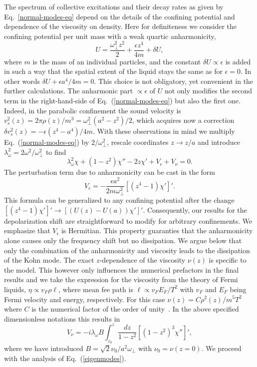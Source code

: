 The spectrum of collective excitations and their decay rates as given by Eq.~\eqref{normal-modes-eq} depend on the details of the confining potential and dependence of the viscosity on density. 
Here for definiteness we consider the confining potential per unit mass with a weak quartic anharmonicity,
\begin{equation}\label{U}
U=\frac{\omega^2_\perp z^2}{2}+\frac{\epsilon z^4}{4m}+\delta U,
\end{equation}
where $m$ is the mass of an individual particles, and the constant $\delta U\propto\epsilon$ is added in such a way that the spatial extent of the liquid stays the same as for $\epsilon=0$. In other words $\delta U+\epsilon a^4/4m=0$. This choice is not obligatory, yet convenient in the further calculations. 
The anharmonic part $\propto\epsilon$ of $U$ not only modifies the second term in the right-hand-side of Eq.~(\ref{normal-modes-eq}) but also the first one. Indeed, in the parabolic confinement the sound velocity is $v^2_s(z)=2\pi \rho(z)/m^3=\omega^2_\perp(a^2-z^2)/2$, which acquires now a correction $\delta v^2_s(z)=-\epsilon(z^4-a^4)/4m$.  
With these observations in mind we multiply Eq.~(\ref{normal-modes-eq}) by $2/\omega^2_\perp$, rescale coordinates $z\to z/a$ and introduce $\lambda^2_\omega=2\omega^2/\omega^2_\perp$ to find 
\begin{equation}\label{eigenmodes}
\lambda^2_\omega\chi+(1-z^2)\chi''-2z\chi'+V_\epsilon+V_\nu=0.
\end{equation}
The perturbation term due to anharmonicity can be cast in the form 
\begin{equation}\label{V1}
V_\epsilon=-\frac{\epsilon a^2}{2m\omega^2_\perp}[ (z^4-1)\chi ']'.
\end{equation}
This formula can be generalized to any confining potential after the change $[(z^4-1)\chi']'\to [(U(z)-U(a))\chi']'$. Consequently, our results for the depolarization shift are straightforward to modify for arbitrary confinements. 
We emphasize that $V_\epsilon$ is Hermitian. 
This property guaranties that the anharmonicity alone causes only the frequency shift but no dissipation. We argue below that only the combination of the anharmonicity and viscosity leads to the dissipation of the Kohn mode. The exact $z$-dependence of the viscosity $\nu(z)$ is specific to the model. This however only influences the numerical prefactors in the final results and we take the expression for the viscosity from the theory of Fermi liquids, $\eta\propto v_F\rho\ell$, where mean fee path is $\ell\propto v_FE_F/T^2$ with $v_F$ and $E_F$ being Fermi velocity and energy, respectively. 
For this case $\nu(z)=C\rho^2(z)/m^5T^2$ where $C$ is the numerical factor of the order of unity~\cite{Abrikosov}. In the above specified dimensionless notations this results in 
\begin{equation}\label{V2}
V_\nu=-i\lambda_\omega B\int^{z}_{z_0}\frac{dz}{1-z^2}[(1-z^2)^3  \chi'']',
\end{equation}
where we have introduced $B=\sqrt{2}\nu_0/a^2\omega_\perp$ with $\nu_0=\nu(z=0)$. We proceed with the analysis of Eq.~(\ref{eigenmodes}). 

